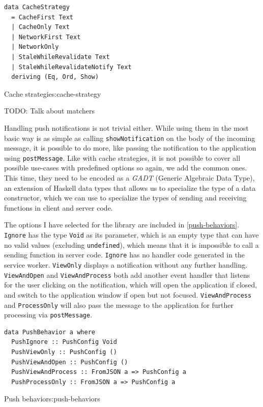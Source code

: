 \documentclass[english,odsaz]{fitthesis}
\begin{document}
\begin{listing}[htbp]
\begin{verbatim}
data CacheStrategy
  = CacheFirst Text
  | CacheOnly Text
  | NetworkFirst Text
  | NetworkOnly
  | StaleWhileRevalidate Text
  | StaleWhileRevalidateNotify Text
  deriving (Eq, Ord, Show)
\end{verbatim}
\caption{Cache strategies:cache-strategy}
\end{listing}

TODO: Talk about matchers

Handling push notifications is not trivial either. While using them in the most
basic way is as simple as calling \texttt{showNotification} on the body of the incoming
message, it is possible to do more, like passing the notification to the
application using \texttt{postMessage}. Like with cache strategies, it is not possible to
cover all possible use-cases with predefined options so again, we add the common
ones. This time, they need to be encoded as a \emph{GADT} (Generic Algebraic Data Type),
an extension of Haskell data types that allows us to specialize the type of a data
constructor, which we can use to specialize the types of sending and receiving
functions in client and server code.

The options I have selected for the library are included in
\ref{push-behaviors}. \texttt{Ignore} has the type \texttt{Void} as its parameter, which is an empty
type that can have no valid values (excluding \texttt{undefined}), which means that it is
impossible to call a sending function in server code. \texttt{Ignore} has no handler code
generated in the service worker. \texttt{ViewOnly} displays a notification without any
further handling. \texttt{ViewAndOpen} and \texttt{ViewAndProcess} both add another event handler
that listens for the user clicking on the notification, which will open the
application if closed, and switch to the application window if open but not
focused. \texttt{ViewAndProcess} and \texttt{ProcessOnly} will also pass the message to the
application for further processing via \texttt{postMessage}.

\begin{listing}[htbp]
\begin{verbatim}
data PushBehavior a where
  PushIgnore :: PushConfig Void
  PushViewOnly :: PushConfig ()
  PushViewAndOpen :: PushConfig ()
  PushViewAndProcess :: FromJSON a => PushConfig a
  PushProcessOnly :: FromJSON a => PushConfig a
\end{verbatim}
\caption{Push behaviors:push-behaviors}
\end{listing}
\end{document}
